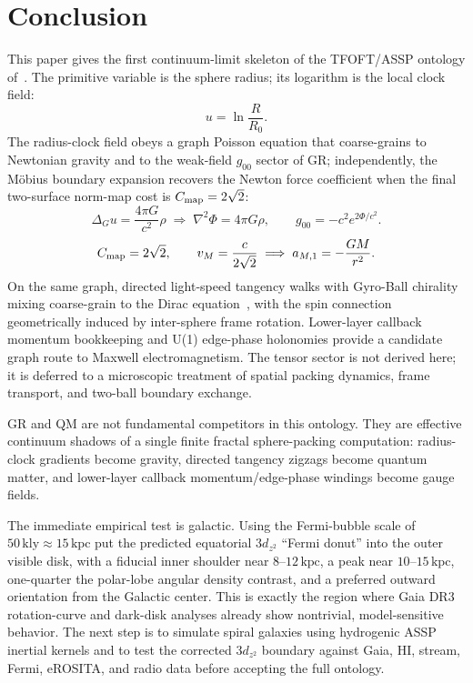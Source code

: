 \documentclass[11pt,a4paper]{article}
\newcommand{\kpc}{\mathrm{kpc}}
\newcommand{\kly}{\mathrm{kly}}
\begin{document}
\section{Conclusion}

This paper gives the first continuum-limit skeleton of the TFOFT/ASSP ontology
of~\cite{TFOFT2026}. The primitive variable is the sphere radius; its logarithm
is the local clock field:
\begin{equation}
  u=\ln\frac{R}{R_0}.
\end{equation}
The radius-clock field obeys a graph Poisson equation that coarse-grains to
Newtonian gravity and to the weak-field $g_{00}$ sector of GR; independently,
the M\"obius boundary expansion recovers the Newton force coefficient when the
final two-surface norm-map cost is $C_{\rm map}=2\sqrt2$:
\begin{equation}
  \Delta_Gu=\frac{4\pi G}{c^2}\rho
  \;\Longrightarrow\;
  \nabla^2\Phi=4\pi G\rho,
  \qquad g_{00}=-c^2e^{2\Phi/c^2}.
\end{equation}
\begin{equation}
  C_{\rm map}=2\sqrt2,
  \qquad
  v_M=\frac{c}{2\sqrt2}
  \;\Longrightarrow\;
  a_{M,1}=-\frac{GM}{r^2}.
\end{equation}
On the same graph, directed light-speed tangency walks with Gyro-Ball
chirality mixing coarse-grain to the Dirac equation~\cite{Ord1983,Dirac1928},
with the spin connection geometrically induced by inter-sphere frame rotation.
Lower-layer callback momentum bookkeeping and U(1) edge-phase holonomies
provide a candidate graph route to Maxwell electromagnetism.  The tensor sector
is not derived here; it is deferred to a microscopic treatment of spatial
packing dynamics, frame transport, and two-ball boundary exchange.

GR and QM are not fundamental competitors in this ontology. They are effective
continuum shadows of a single finite fractal sphere-packing computation:
radius-clock gradients become gravity, directed tangency zigzags become
quantum matter, and lower-layer callback momentum/edge-phase windings become
gauge fields.

The immediate empirical test is galactic. Using the Fermi-bubble scale
of $50\,\kly\approx15\,\kpc$ put the predicted equatorial
$3d_{z^2}$ ``Fermi donut'' into the outer visible disk, with a fiducial inner
shoulder near $8$--$12\,\kpc$, a peak near $10$--$15\,\kpc$, one-quarter
the polar-lobe angular density contrast, and a preferred outward orientation
from the Galactic center. This is exactly the region where Gaia
DR3 rotation-curve and dark-disk analyses already show nontrivial,
model-sensitive behavior. The next step is to simulate spiral galaxies using
hydrogenic ASSP inertial kernels and to test the corrected $3d_{z^2}$ boundary
against Gaia, HI, stream, Fermi, eROSITA, and radio data before accepting the
full ontology.
\end{document}
